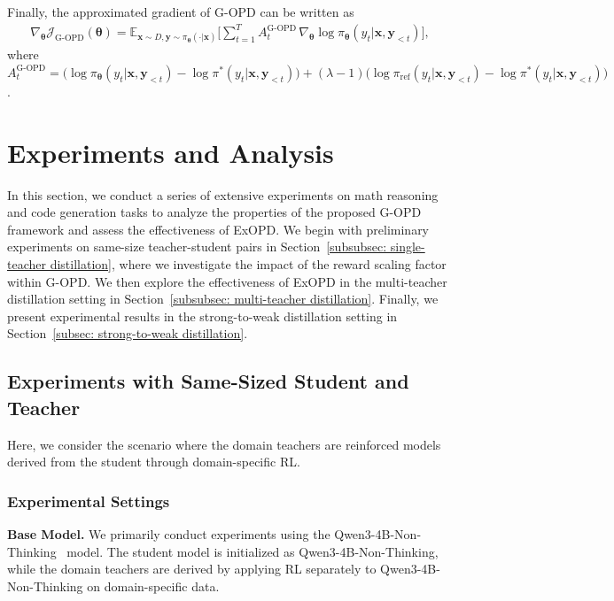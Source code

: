 \documentclass{article} %
\begin{document}
Finally, the approximated gradient of G-OPD can be written as
\begin{equation}
\begin{aligned}
\nabla_{\boldsymbol{\theta}} \mathcal{J}_{\text{G-OPD}}(\boldsymbol{\theta}) = 
\mathbb{E}_{\boldsymbol{x} \sim D, \boldsymbol{y} \sim \pi_{\boldsymbol{\theta}} (\cdot | \boldsymbol{x}) }\Big[
\sum_{t=1}^{T} A_{t}^{\text{G-OPD}} \, \nabla_{\boldsymbol{\theta}} \log \pi_{\boldsymbol{\theta}}(y_t| \boldsymbol{x}, \boldsymbol{y}_{<t} ) 
\Big],
\end{aligned}
\end{equation}
where $A_{t}^{\text{G-OPD}} = \big(\log \pi_{\boldsymbol{\theta}}(y_t| \boldsymbol{x}, \boldsymbol{y}_{<t} ) - \log \pi^{*}(y_t| \boldsymbol{x}, \boldsymbol{y}_{<t} ) \big) + (\lambda - 1)\big(\log \pi_{\text{ref}}(y_t| \boldsymbol{x}, \boldsymbol{y}_{<t} ) - \log \pi^{*}(y_t| \boldsymbol{x}, \boldsymbol{y}_{<t} ) \big)$.


\section{Experiments and Analysis}
In this section, we conduct a series of extensive experiments on math reasoning and code generation tasks to analyze the properties of the proposed G-OPD framework and assess the effectiveness of ExOPD. We begin with preliminary experiments on same-size teacher-student pairs in Section~\ref{subsubsec: single-teacher distillation}, where we investigate the impact of the reward scaling factor within G-OPD. We then explore the effectiveness of ExOPD in the multi-teacher distillation setting in Section~\ref{subsubsec: multi-teacher distillation}. Finally, we present experimental results in the strong-to-weak distillation setting in Section~\ref{subsec: strong-to-weak distillation}.


\subsection{Experiments with Same-Sized Student and Teacher}
\label{subsec: same-sized distillation}
Here, we consider the scenario where the domain teachers are reinforced models derived from the student through domain-specific RL. 

\subsubsection{Experimental Settings}
\textbf{Base Model.} We primarily conduct experiments using the Qwen3-4B-Non-Thinking~\citep{qwen3} model. The student model is initialized as Qwen3-4B-Non-Thinking, while the domain teachers are derived by applying RL separately to Qwen3-4B-Non-Thinking on domain-specific data.
\end{document}
